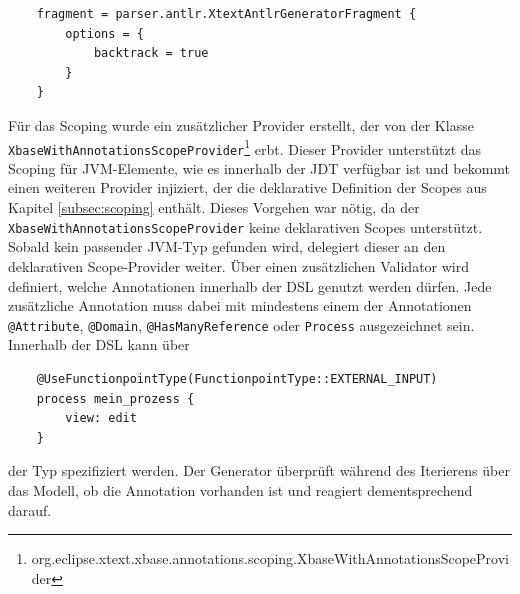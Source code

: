 \documentclass[a4paper,12pt]{scrreprt}
\begin{document}
\begin{verbatim}
    fragment = parser.antlr.XtextAntlrGeneratorFragment {
        options = {
            backtrack = true
        }
    }
\end{verbatim}
Für das Scoping wurde ein zusätzlicher Provider erstellt, der von der Klasse \verb+XbaseWithAnnotationsScopeProvider+\footnote{org.eclipse.xtext.xbase.annotations.scoping.XbaseWithAnnotationsScopeProvider} erbt. Dieser Provider unterstützt das Scoping für JVM-Elemente, wie es innerhalb der JDT verfügbar ist und bekommt einen weiteren Provider injiziert, der die deklarative Definition der Scopes aus Kapitel \ref{subsec:scoping} enthält. Dieses Vorgehen war nötig, da der \verb+XbaseWithAnnotationsScopeProvider+ keine deklarativen Scopes unterstützt. Sobald kein passender JVM-Typ gefunden wird, delegiert dieser an den deklarativen Scope-Provider weiter.
Über einen zusätzlichen Validator wird definiert, welche Annotationen innerhalb der DSL genutzt werden dürfen. Jede zusätzliche Annotation muss dabei mit mindestens einem der Annotationen \verb+@Attribute+, \verb+@Domain+, \verb+@HasManyReference+ oder \verb+Process+ ausgezeichnet sein.
Innerhalb der DSL kann über 
\begin{verbatim}
    @UseFunctionpointType(FunctionpointType::EXTERNAL_INPUT)
    process mein_prozess {
        view: edit
    }
\end{verbatim}
der Typ spezifiziert werden.
Der Generator überprüft während des Iterierens über das Modell, ob die Annotation vorhanden ist und reagiert dementsprechend darauf.
\end{document}
